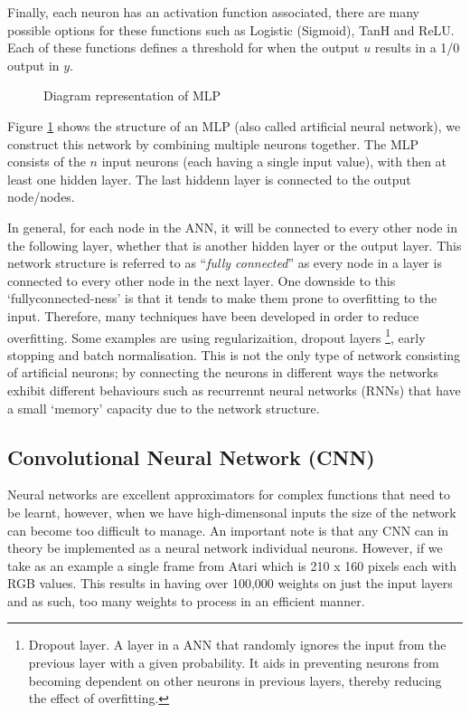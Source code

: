 Finally, each neuron has an activation function associated, there are many possible options for these functions such as Logistic (Sigmoid), TanH and ReLU. Each of these functions defines a threshold for when the output $u$ results in a 1/0 output in $y$.

\begin{figure}[ht!]
	\centering
	\caption{Diagram representation of MLP} \label{fig:mlp}
\end{figure}

Figure \ref{fig:mlp} shows the structure of an MLP (also called artificial neural network), we construct this network by combining multiple neurons together. The MLP consists of the $n$ input neurons (each having a single input value), with then at least one hidden layer. The last hiddenn layer is connected to the output node/nodes.

In general, for each node in the ANN, it will be connected to every other node in the following layer, whether that is another hidden layer or the output layer. This network structure is referred to as ``\textit{fully connected}'' as every node in a layer is connected to every other node in the next layer. One downside to this `fullyconnected-ness' is that it tends to make them prone to overfitting to the input. Therefore, many techniques have been developed in order to reduce overfitting. Some examples are using regularizaition, dropout layers \footnote{Dropout layer. A layer in a ANN that randomly ignores the input from the previous layer with a given probability. It aids in preventing neurons from becoming dependent on other neurons in previous layers, thereby reducing the effect of overfitting.}, early stopping and batch normalisation. This is not the only type of network consisting of artificial neurons; by connecting the neurons in different ways the networks exhibit different behaviours such as recurrennt neural networks (RNNs) that have a small `memory' capacity due to the network structure.

\subsection{Convolutional Neural Network (CNN)}
\label{dsgn:sec:dl:cnn}
Neural networks are excellent approximators for complex functions that need to be learnt, however, when we have high-dimensonal inputs the size of the network can become too difficult to manage. An important note is that any CNN can in theory be implemented as a neural network individual neurons. However, if we take as an example a single frame from Atari which is 210 x 160 pixels each with RGB values. This results in having over 100,000 weights on just the input layers and as such, too many weights to process in an efficient manner.

